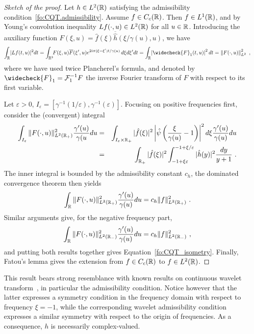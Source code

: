 \begin{proof}[Sketch of the proof]
Let $h\in L^2(\mathbb{R})$ satisfying the admissibility condition~\eqref{fo:CQT.admissibility}. Assume $f\in C_c(\mathbb{R})$. Then $f\in L^1(\mathbb{R})$, and by Young's convolution inequality $Lf(\cdot,u)\in L^2(\mathbb{R})$ for all $u\in\mathbb{R}$. Introducing the auxiliary function $F(\xi,u)=\hat f(\xi) \overline{\hat h}(\xi/\gamma(u),u)$, we have
\[
\int_{\R}\! |Lf(t,u)|^2 dt = \int_{\R^3}\!\! F(\xi,u)\overline{F}(\xi',u)e^{2i\pi (\xi-\xi')t/\gamma(u)}\,d\xi d\xi' dt=\int_{\R}\! \left|\widecheck{F}_1(t,u)\right|^2 dt = \left\|F(\cdot,u)\right\|^2_{L^2}\ ,
\]
where we have used twice Plancherel's formula, and denoted by $\widecheck{F}_1=\mathcal{F}_1^{-1}F$ the inverse Fourier transform of $F$ with respect to its first variable.

Let $\varepsilon>0$, $I_\varepsilon = [\gamma^{-1}(1/\varepsilon),\gamma^{-1}(\varepsilon)]$. Focusing on positive frequencies first,  consider the (convergent) integral
\begin{eqnarray*}
\int_{I_\varepsilon} \|F(\cdot,u)\|_{L^2(\mathbb{R}_+)}^2 \frac{\gamma'(u)}{\gamma(u} du &=& \int_{I_\varepsilon\times\mathbb{R}_+} |\hat f(\xi)|^2\left|\hat\psi\left(\frac{\xi}{\gamma(u)}-1\right)\right|^2d\xi\frac{\gamma'(u)}{\gamma(u)}du\\
&=& \int_{\mathbb{R}_+} |\hat f(\xi)|^2\int_{-1+\xi\varepsilon}^{-1+\xi/\varepsilon} |\hat h(y)|^2\frac{dy}{y+1}\ .
\end{eqnarray*}
The inner integral is bounded by the admissibility constant $c_h$, the dominated convergence theorem then yields
\[
\int_{\mathbb{R}} \|F(\cdot,u)\|_{L^2(\mathbb{R}_+)}^2 \frac{\gamma'(u)}{\gamma(u)} du =c_h \|f\|_{L^2(\mathbb{R}_+)}^2\ .
\]
Similar arguments give, for the negative frequency part,
\[
\int_{\mathbb{R}} \|F(\cdot,u)\|_{L^2(\mathbb{R}_-)}^2 \frac{\gamma'(u)}{\gamma(u)} du =c_h \|f\|_{L^2(\mathbb{R}_-)}^2\ ,
\]
and putting both results together gives Equation~\eqref{fo:CQT_isometry}. Finally, Fatou's lemma gives the extension from $f\in C_c(\mathbb{R})$ to $f\in L^2(\mathbb{R})$.
\end{proof}
This result bears strong resemblance with known results on continuous wavelet transform~\cite{Grossmann1984decomposition}, in particular the admissibility condition. Notice however that the latter expresses a symmetry condition in the frequency domain with respect to frequency $\xi=-1$, while the corresponding wavelet admissibility condition expresses a similar symmetry with respect to the origin of frequencies. As a consequence, $h$ is necessarily complex-valued.

